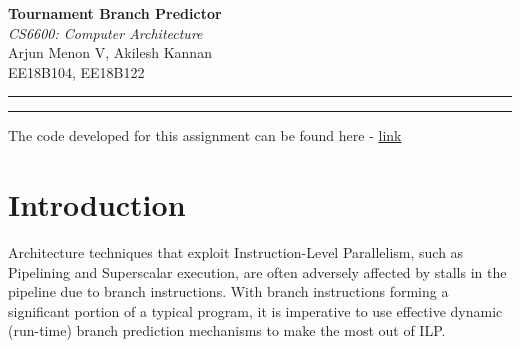 \documentclass[12pt,a4paper,english]{paper}
\def \courseNumber {CS6600}
\def \courseName {Computer Architecture}
\def \assignmentName {Tournament Branch Predictor}
\def \myName {Arjun Menon V, Akilesh Kannan}
\def \rollNumber {EE18B104, EE18B122}
\newenvironment{warning}{%
  \def\FrameCommand{%
    \hspace{1pt}%
    {\color{red}\vrule width 2pt}%
    {\color{formalred}\vrule width 4pt}%
    \colorbox{formalred}%
  }%
  \MakeFramed{\advance\hsize-\width\FrameRestore}%
  \noindent\hspace{-4.55pt}%
  \begin{adjustwidth}{7pt}{}%
  \vspace{2pt}\vspace{2pt}%
}
{%
  \vspace{2pt}\end{adjustwidth}\endMakeFramed%
}
\begin{document}
 
\thispagestyle{empty}
\vspace{-4.5cm}

\hspace*{-\parindent}
\begin{minipage}{0.65\textwidth}
\fontsize{22pt}{10pt}\selectfont\textbf{\assignmentName}\\[1mm]
\Large
\textit{\courseNumber: \courseName}\\[5mm]
\Large \myName \\[1mm]
\normalsize \rollNumber \\
\end{minipage}\hfill%

\hrule \hrule
\medskip

\begin{warning}
The code developed for this assignment can be found here - \href{https://github.com/aklsh/TournamentBPU}{link}
\end{warning}

\section{Introduction}
Architecture techniques that exploit Instruction-Level Parallelism, such as Pipelining and Superscalar execution, are often adversely affected by stalls in the pipeline due to branch instructions. With branch instructions forming a significant portion of a typical program, it is imperative to use effective dynamic (run-time) branch prediction mechanisms to make the most out of ILP.
\end{document}
